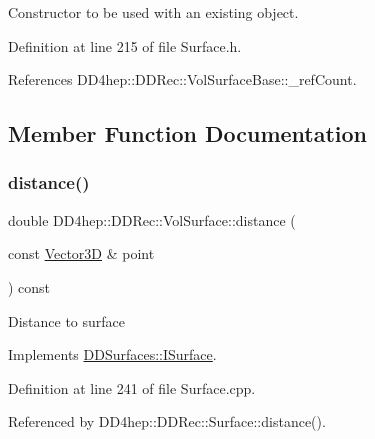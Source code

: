 Constructor to be used with an existing object. 



Definition at line 215 of file Surface.\+h.



References D\+D4hep\+::\+D\+D\+Rec\+::\+Vol\+Surface\+Base\+::\+\_\+ref\+Count.



\subsection{Member Function Documentation}
\hypertarget{class_d_d4hep_1_1_d_d_rec_1_1_vol_surface_aa619b563fdbb84fe93d7b983d2ab277c}{}\label{class_d_d4hep_1_1_d_d_rec_1_1_vol_surface_aa619b563fdbb84fe93d7b983d2ab277c} 
\subsubsection{\texorpdfstring{distance()}{distance()}}
{\footnotesize\ttfamily double D\+D4hep\+::\+D\+D\+Rec\+::\+Vol\+Surface\+::distance (\begin{DoxyParamCaption}\item[{const \hyperlink{class_d_d_surfaces_1_1_vector3_d}{Vector3D} \&}]{point }\end{DoxyParamCaption}) const\hspace{0.3cm}{\ttfamily [virtual]}}

Distance to surface 

Implements \hyperlink{class_d_d_surfaces_1_1_i_surface_a430ebd157354388b50218dfb356a9ca1}{D\+D\+Surfaces\+::\+I\+Surface}.



Definition at line 241 of file Surface.\+cpp.



Referenced by D\+D4hep\+::\+D\+D\+Rec\+::\+Surface\+::distance().

\hypertarget{class_d_d4hep_1_1_d_d_rec_1_1_vol_surface_a0800bcb853b43a688721247dd4031122}{}\label{class_d_d4hep_1_1_d_d_rec_1_1_vol_surface_a0800bcb853b43a688721247dd4031122} 
